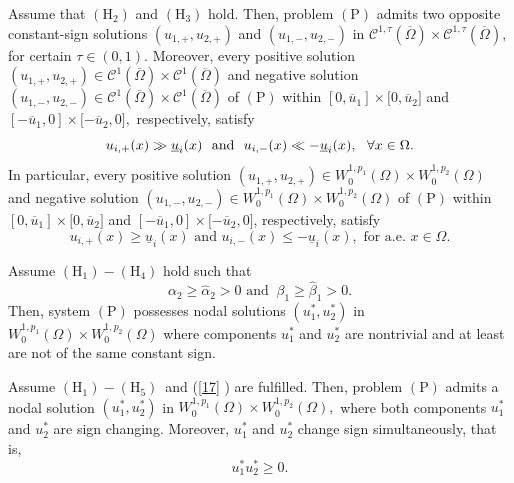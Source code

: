 \documentclass[10pt,a4paper]{amsart}
\begin{document}
\begin{theorem}
\label{T1}Assume that $(\mathrm{H}_{2})$ and $(\mathrm{H}_{3})$ hold. Then,
problem $(\mathrm{P})$ admits two opposite constant-sign solutions $%
(u_{1,+},u_{2,+})$ and $(u_{1,-},u_{2,-})$ in $\mathcal{C}^{1,\tau }( 
\overline{\Omega })\times \mathcal{C}^{1,\tau }(\overline{\Omega }),$ for
certain $\tau \in (0,1).$ Moreover, every positive solution $%
(u_{1,+},u_{2,+})\in \mathcal{C}^{1}(\overline{\Omega })\times \mathcal{C}
^{1}(\overline{\Omega })$ and negative solution $(u_{1,-},u_{2,-})\in 
\mathcal{C}^{1}(\overline{\Omega })\times \mathcal{C}^{1}(\overline{\Omega }
) $ of $(\mathrm{P})$ within $[0,\overline{u}_{1}]\times \lbrack 0,\overline{
u}_{2}]$ and $[-\overline{u}_{1},0]\times \lbrack -\overline{u}_{2},0],$
respectively, satisfy 
\begin{equation}
u_{i,+}(x)\gg \underline{u}_{i}(x)\text{ \ and \ }u_{i,-}(x)\ll -\underline{%
u }_{i}(x),\text{ \ }\forall x\in \Omega .  \label{9}
\end{equation}
In particular, every positive solution $(u_{1,+},u_{2,+})\in
W_{0}^{1,p_{1}}(\Omega )\times W_{0}^{1,p_{2}}(\Omega )$ and negative
solution $(u_{1,-},u_{2,-})\in W_{0}^{1,p_{1}}(\Omega )\times
W_{0}^{1,p_{2}}(\Omega )$ of $(\mathrm{P})$ within $[0,\overline{u}
_{1}]\times \lbrack 0,\overline{u}_{2}]$ and $[-\overline{u}_{1},0]\times
\lbrack -\overline{u}_{2},0]$, respectively, satisfy 
\begin{equation}
u_{i,+}(x)\geq \underline{u}_{i}(x)\text{ \ and \ }u_{i,-}(x)\leq - 
\underline{u}_{i}(x),\text{ \ for a.e. }x\in \Omega .  \label{10}
\end{equation}
\end{theorem}

\begin{theorem}
\label{T2}Assume $(\mathrm{H}_{1})-(\mathrm{H}_{4})$ hold such that 
\begin{equation}
\alpha _{2}\geq \hat{\alpha}_{2}>0\text{ \ and }\ \beta _{1}\geq \hat{\beta}%
_{1}>0.  \label{17}
\end{equation}%
Then, system $(\mathrm{P})$ possesses nodal solutions $(u_{1}^{\ast
},u_{2}^{\ast })$ in $W_{0}^{1,p_{1}}(\Omega )\times W_{0}^{1,p_{2}}(\Omega
) $ where components $u_{1}^{\ast }$ and $u_{2}^{\ast }$ are nontrivial and
at least are not of the same constant sign.
\end{theorem}

\begin{theorem}
\label{T4} Assume $(\mathrm{H}_{1})-(\mathrm{H}_{5})$\textrm{\ }and (\ref{17}
) are fulfilled. Then, problem $(\mathrm{P})$ admits a nodal solution $%
(u_{1}^{\ast },u_{2}^{\ast })$ in $W_{0}^{1,p_{1}}(\Omega )\times
W_{0}^{1,p_{2}}(\Omega ),$ where both components $u_{1}^{\ast }$ and $%
u_{2}^{\ast }$ are sign changing. Moreover, $u_{1}^{\ast }$ and $u_{2}^{\ast
}$ change sign simultaneously, that is, 
\begin{equation}
u_{1}^{\ast }u_{2}^{\ast }\geq 0.  \label{55}
\end{equation}
\end{theorem}
\end{document}
